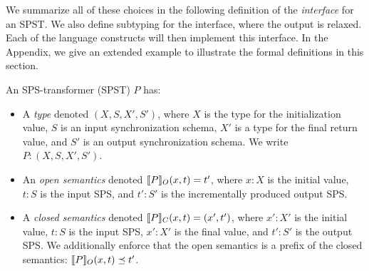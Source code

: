 
We summarize all of these choices in the following definition of the \emph{interface}
for an SPST.
We also define subtyping for the interface, where the output is relaxed.
Each of the language constructs will then implement this interface.
In the Appendix, we give an extended example
to illustrate the formal definitions in this section.

\begin{definition}
An SPS-transformer (SPST) $P$
has:
\begin{itemize}
\item A \emph{type} denoted $(X, S, X', S')$,
where
$X$ is the type for the initialization value,
$S$ is an input synchronization schema,
$X'$ is a type for the final return value,
and $S'$ is an output synchronization schema.
We write $P: (X, S, X', S')$.

\item An \emph{open semantics} denoted $\spstsemO{x}{t}{P} = t'$,
where $x: X$ is the initial value, $t: S$ is the input SPS,
and $t': S'$ is the incrementally produced output SPS.

\item A \emph{closed semantics} denoted $\spstsemC{x}{t}{P} = (x', t')$,
where $x': X'$ is the initial value, $t: S$ is the input SPS,
$x': X'$ is the final value, and $t': S'$ is the output SPS.
We additionally enforce that the open semantics is a prefix
of the closed semantics:
$\spstsemO{x}{t}{P} \prefix t'$.

\end{itemize}
\end{definition}


